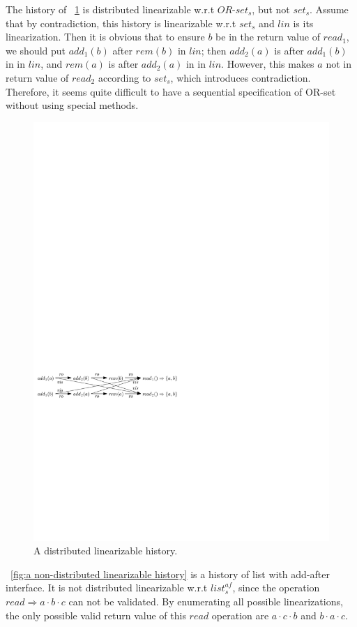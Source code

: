 The history of \figurename~\ref{fig:a distributed linearizable history} is distributed linearizable w.r.t $\mathit{OR}$-$\mathit{set}_s$, but not $\mathit{set}_s$. Assume that by contradiction, this history is linearizable w.r.t $\mathit{set}_s$ and $\mathit{lin}$ is its linearization. Then it is obvious that to ensure $b$ be in the return value of $\mathit{read}_1$, we should put $\mathit{add}_1(b)$ after $\mathit{rem}(b)$ in $\mathit{lin}$; then $\mathit{add}_2(a)$ is after $\mathit{add}_1(b)$ in in $\mathit{lin}$, and $\mathit{rem}(a)$ is after $\mathit{add}_2(a)$ in in $\mathit{lin}$. However, this makes $a$ not in return value of $\mathit{read}_2$ according to $\mathit{set}_s$, which introduces contradiction. Therefore, it seems quite difficult to have a sequential specification of OR-set without using special methods.

\begin{figure}[t]
  \centering
  \includegraphics[width=0.7 \textwidth]{figures/PIC-His-Lin-ORSet.pdf}
  \caption{A distributed linearizable history.}
  \label{fig:a distributed linearizable history}
\end{figure}

\figurename~\ref{fig:a non-distributed linearizable history} is a history of list with add-after interface. It is not distributed linearizable w.r.t $\mathit{list}_s^{\mathit{af}}$, since the operation $\mathit{read} \Rightarrow a \cdot b \cdot c$ can not be validated. By enumerating all possible linearizations, the only possible valid return value of this $\mathit{read}$ operation are $a \cdot c \cdot b$ and $b \cdot a \cdot c$.

